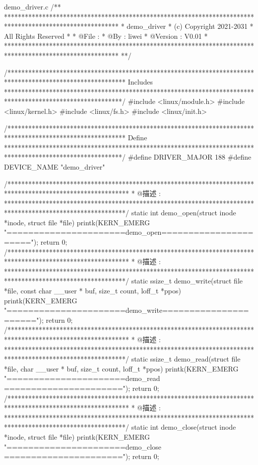 \documentclass[lang=cn,newtx,10pt,scheme=chinese]{elegantbook}
\begin{document}
\begin{mycode}{demo\_driver.c}
/**
*********************************************************************************************************
*                                        		demo_driver
*                                      (c) Copyright 2021-2031
*                                         All Rights Reserved
*
* @File    : 
* @By      : liwei
* @Version : V0.01
* 
*********************************************************************************************************
**/

/**********************************************************************************************************
Includes 
**********************************************************************************************************/
#include <linux/module.h>
#include <linux/kernel.h>
#include <linux/fs.h>
#include <linux/init.h>

/**********************************************************************************************************
Define
**********************************************************************************************************/
#define    DRIVER_MAJOR     188
#define    DEVICE_NAME     "demo_driver"


/***********************************************************************************************************
* @描述	:  
***********************************************************************************************************/
static int demo_open(struct inode *inode, struct file *file)
{	
	printk(KERN_EMERG "======================demo_open======================\n");
	return 0;
}
/***********************************************************************************************************
* @描述	:  
***********************************************************************************************************/
static ssize_t demo_write(struct file *file, const char __user * buf, size_t count, loff_t *ppos)
{
    printk(KERN_EMERG "======================demo_write======================\n");
    return 0;
}
/***********************************************************************************************************
* @描述	:  
***********************************************************************************************************/
static ssize_t demo_read(struct file *file,  char __user * buf, size_t count, loff_t *ppos)
{
    printk(KERN_EMERG "======================demo_read ======================\n");  
    return 0;
}
/***********************************************************************************************************
* @描述	:  
***********************************************************************************************************/
static int demo_close(struct inode *inode, struct file *file)
{
    printk(KERN_EMERG "======================demo_close ======================\n");
    return 0;
}


\end{mycode}
\end{document}
